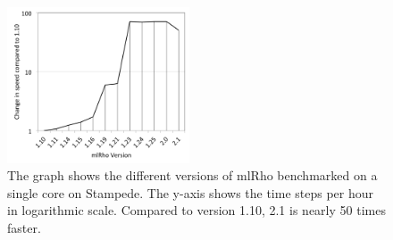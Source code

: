 \documentclass{sig-alternate}
\newcommand{\abhi}[1]{ {\textcolor{red} { ***Abhinav: #1 }}}
\newcommand{\abhi}[1]{ {}}
\begin{document}
\begin{figure} %
\centering
\includegraphics[width=0.48\textwidth]{figures/mlrho-benchmarks.png}
\caption{The graph shows the different versions of mlRho benchmarked on a single core on Stampede. The y-axis shows the time steps per hour in logarithmic scale. Compared to version 1.10,  2.1 is nearly 50 times faster. }
\label{fig:stampede-bench}
\end{figure}

%

\end{document}
